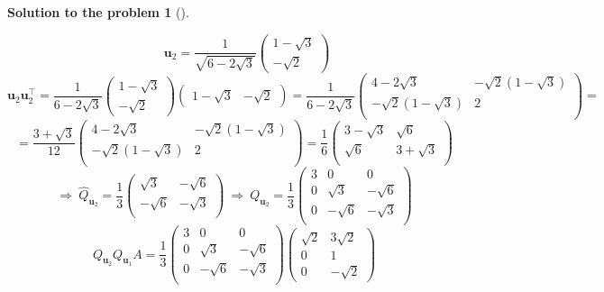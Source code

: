 \documentclass[12pt,a4]{article}
\newtheorem{solution}{Solution to the problem}
\newcommand{\bu}{{\mathbf u}}
\begin{document}
\begin{solution}[]
\begin{enumerate}[(a)]
\[\qquad
\bu_2 =
\frac{1}{\sqrt{6 - 2\sqrt 3}}
\begin{pmatrix} 1 - \sqrt 3 \\ - \sqrt 2  \end{pmatrix}
\]
\[
\bu_2\bu_2^\top = 
\frac{1}{6 - 2\sqrt 3}
\begin{pmatrix} 1 - \sqrt 3 \\ - \sqrt 2  \end{pmatrix}
\begin{pmatrix} 1 - \sqrt 3 & - \sqrt 2  \end{pmatrix}
=
\frac{1}{6 - 2\sqrt 3}
\begin{pmatrix}
4 - 2\sqrt 3 & - \sqrt 2 (1 - \sqrt 3) \\
 - \sqrt 2 (1 - \sqrt 3) & 2\\
\end{pmatrix}
 =
\]\[
=
\frac{3 + \sqrt 3}{12}
\begin{pmatrix}
4 - 2\sqrt 3 & - \sqrt 2 (1 - \sqrt 3) \\
 - \sqrt 2 (1 - \sqrt 3) & 2\\
\end{pmatrix}
 =
\frac{1}{6}
\begin{pmatrix}
3 - \sqrt 3 & \sqrt 6 \\
 \sqrt 6  & 3 + \sqrt 3\\
\end{pmatrix}
\]
\[
\Rightarrow ~
\hat Q_{\bu_2} =
\frac{1}{3}
\begin{pmatrix}
\sqrt 3 & - \sqrt 6 \\
 -\sqrt 6 & - \sqrt 3\\
\end{pmatrix}
~\Rightarrow ~
Q_{\bu_2} =
\frac{1}{3}
\begin{pmatrix}
3 & 0 & 0 \\
0 & \sqrt 3 & - \sqrt 6 \\
0 &  -\sqrt 6 & - \sqrt 3\\
\end{pmatrix}
\]
\[
Q_{\bu_2} Q_{\bu_1} A = 
\frac{1}{3}
\begin{pmatrix}
3 & 0 & 0 \\
0 & \sqrt 3 & - \sqrt 6 \\
0 &  -\sqrt 6 & - \sqrt 3\\
\end{pmatrix}
\begin{pmatrix}
\sqrt 2 & 3\sqrt 2\\
0 & 1 \\
0 & -\sqrt 2
\end{pmatrix}
\]
\end{enumerate}
\end{solution}
\end{document}
